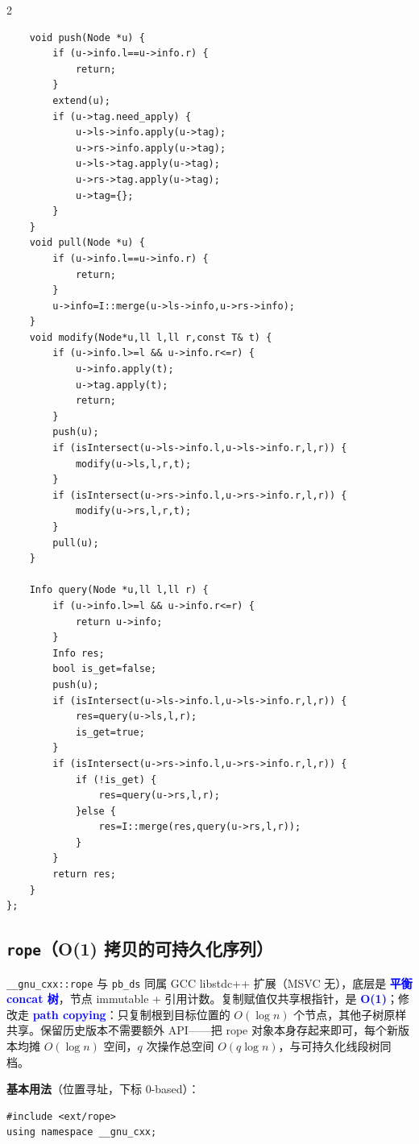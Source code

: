 \begin{multicols*}{2}
\begin{verbatim}
    void push(Node *u) {
        if (u->info.l==u->info.r) {
            return;
        }
        extend(u);
        if (u->tag.need_apply) {
            u->ls->info.apply(u->tag);
            u->rs->info.apply(u->tag);
            u->ls->tag.apply(u->tag);
            u->rs->tag.apply(u->tag);
            u->tag={};
        }
    }
    void pull(Node *u) {
        if (u->info.l==u->info.r) {
            return;
        }
        u->info=I::merge(u->ls->info,u->rs->info);
    }
    void modify(Node*u,ll l,ll r,const T& t) {
        if (u->info.l>=l && u->info.r<=r) {
            u->info.apply(t);
            u->tag.apply(t);
            return;
        }
        push(u);
        if (isIntersect(u->ls->info.l,u->ls->info.r,l,r)) {
            modify(u->ls,l,r,t);
        }
        if (isIntersect(u->rs->info.l,u->rs->info.r,l,r)) {
            modify(u->rs,l,r,t);
        }
        pull(u);
    }

    Info query(Node *u,ll l,ll r) {
        if (u->info.l>=l && u->info.r<=r) {
            return u->info;
        }
        Info res;
        bool is_get=false;
        push(u);
        if (isIntersect(u->ls->info.l,u->ls->info.r,l,r)) {
            res=query(u->ls,l,r);
            is_get=true;
        }
        if (isIntersect(u->rs->info.l,u->rs->info.r,l,r)) {
            if (!is_get) {
                res=query(u->rs,l,r);
            }else {
                res=I::merge(res,query(u->rs,l,r));
            }
        }
        return res;
    }
};

	\end{verbatim}

	\subsection{\texttt{rope}（O(1) 拷贝的可持久化序列）}

	\verb|__gnu_cxx::rope| 与 \verb|pb_ds| 同属 GCC libstdc++ 扩展（MSVC 无），底层是 \textcolor{blue}{\textbf{平衡 concat 树}}，节点 immutable + 引用计数。复制赋值仅共享根指针，是 \textcolor{blue}{\textbf{O(1)}}；修改走 \textcolor{blue}{\textbf{path copying}}：只复制根到目标位置的 $O(\log n)$ 个节点，其他子树原样共享。保留历史版本不需要额外 API——把 rope 对象本身存起来即可，每个新版本均摊 $O(\log n)$ 空间，$q$ 次操作总空间 $O(q \log n)$，与可持久化线段树同档。

	\textbf{基本用法}（位置寻址，下标 0-based）：

	\begin{verbatim}
#include <ext/rope>
using namespace __gnu_cxx;


\end{verbatim}
\end{multicols*}
